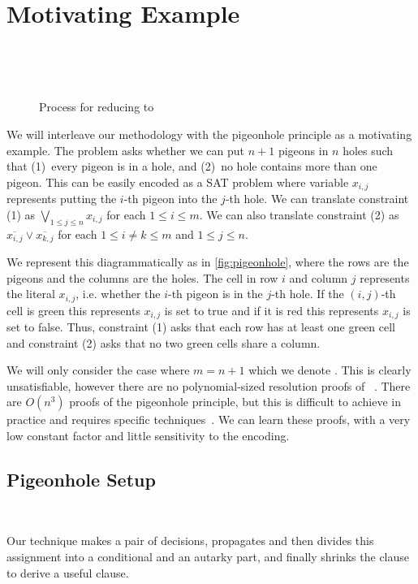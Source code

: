 \section{Motivating Example}~\label{sec:motivatex}

\begin{figure}[!t]
    \centering
    
    \caption{Process for reducing  to }~\label{fig:pigeonhole}
  \end{figure}

We will interleave our methodology with the pigeonhole principle as a motivating
example. The problem  asks whether we can put $n+1$ pigeons in $n$ holes
such that (1)~every pigeon is in a hole, and (2)~no hole contains more than one
pigeon. This can be easily encoded as a SAT problem where variable $x_{i, j}$
represents putting the $i$-th pigeon into the $j$-th hole. We can translate
constraint (1) as $\bigvee_{1 \leq j \leq n} x_{i, j}$ for each $1 \leq i \leq
m$. We can also translate constraint (2) as $\overline{x_{i, j}} \lor
\overline{x_{k, j}}$ for each $ 1 \leq i \neq k \leq m$ and $1 \leq j \leq n$.

We represent this diagrammatically as in \autoref{fig:pigeonhole}, where the
rows are the pigeons and the columns are the holes. The cell in row $i$ and
column $j$ represents the literal $x_{i, j}$, i.e. whether the $i$-th pigeon is
in the $j$-th hole. If the $(i, j)$-th cell is green this represents $x_{i, j}$
is set to true and if it is red this represents $x_{i, j}$ is set to false.
Thus, constraint (1) asks that each row has at least one green cell and
constraint (2) asks that no two green cells share a column.

We will only consider the case where $m = n + 1$ which we denote . This is
clearly unsatisfiable, however there are no polynomial-sized resolution proofs
of ~\cite{hakenpigeonhole}. There are $O(n^3)$ \pr proofs of the
pigeonhole principle, but this is difficult to achieve in practice and requires
specific techniques~\cite{prclauses}. We can learn these proofs, with a very low
constant factor and little sensitivity to the encoding.


\subsection{Pigeonhole Setup}~\label{subsec:pigeonhole-setup}

Our technique makes a pair of decisions, propagates and then divides this assignment into a conditional and an autarky part, and finally shrinks the clause to derive a useful \pr clause.

